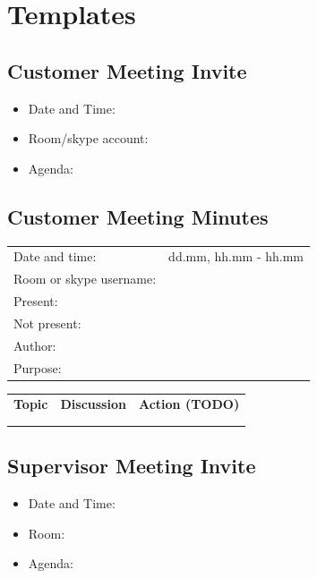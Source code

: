 \chapter{Templates}
\label{chap:templates}

\section{Customer Meeting Invite}

\begin{itemize}
	\item Date and Time:
	\item Room/skype account:
	\item Agenda:
\end{itemize}

\section{Customer Meeting Minutes}

\begin{tabular}{| p{3cm} | p{9cm} |}
	\hline
	\rowcolor{gray}
	\multicolumn{2}{|c|}{\Large \bf Meeting Minutes - Customer Meeting} \\ \hline
	Date and time: & dd.mm,  hh.mm - hh.mm \\ \hline
	Room or skype username: &  \\ \hline
	Present: &  \\ \hline
	Not present: &  \\ \hline
	Author: &  \\ \hline
	Purpose: &  \\ \hline
\end{tabular}

\begin{tabular}{| p{} | p{} | p{} |}
	\hline
	\rowcolor{gray}
	\multicolumn{3}{|c|}{\Large \bf Agenda} \\ \hline
	{\bf Topic} & {\bf Discussion} & {\bf Action (TODO)} \\ \hline
	& & \\ \hline
	& & \\ \hline
\end{tabular}

\section{Supervisor Meeting Invite}

\begin{itemize}
	\item Date and Time:
	\item Room:
	\item Agenda:
\end{itemize}

